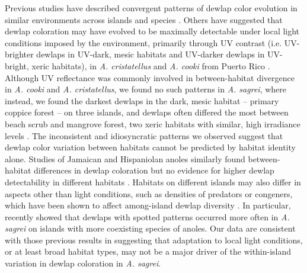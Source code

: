 Previous studies have described convergent patterns of dewlap color evolution in similar environments across islands and species \citep{Thorpe2002a, Thorpe2002b}. Others have suggested that dewlap coloration may have evolved to be maximally detectable under local light conditions imposed by the environment, primarily through UV contrast (i.e. UV-brighter dewlaps in UV-dark, mesic habitats and UV-darker dewlaps in UV-bright, xeric habitats), in \textit{A. cristatellus} and \textit{A. cooki} from Puerto Rico \citep{Leal2002, Leal2004}. Although UV reflectance was commonly involved in between-habitat divergence in \textit{A. cooki} and \textit{A. cristatellus}, we found no such patterns in \textit{A. sagrei}, where instead, we found the darkest dewlaps in the dark, mesic habitat -- primary coppice forest -- on three islands, and dewlaps often differed the most between beach scrub and mangrove forest, two xeric habitats with similar, high irradiance levels \citep{Howard1950, Schoener1968}. The inconsistent and idiosyncratic patterns we observed suggest that dewlap color variation between habitats cannot be predicted by habitat identity alone. Studies of Jamaican and Hispaniolan anoles similarly found between-habitat differences in dewlap coloration but no evidence for higher dewlap detectability in different habitats \citep{Fleishman2009, Ng2012}. Habitats on different islands may also differ in aspects other than light conditions, such as densities of predators or congeners, which have been shown to affect among-island dewlap diversity \citep{Vanhooydonck2009, Baeckens2018}. In particular, \citet{Baeckens2018} recently showed that dewlaps with spotted patterns occurred more often in \textit{A. sagrei} on islands with more coexisting species of anoles. Our data are consistent with those previous results in suggesting that adaptation to local light conditions, or at least broad habitat types, may not be a major driver of the within-island variation in dewlap coloration in \textit{A. sagrei}.\\


